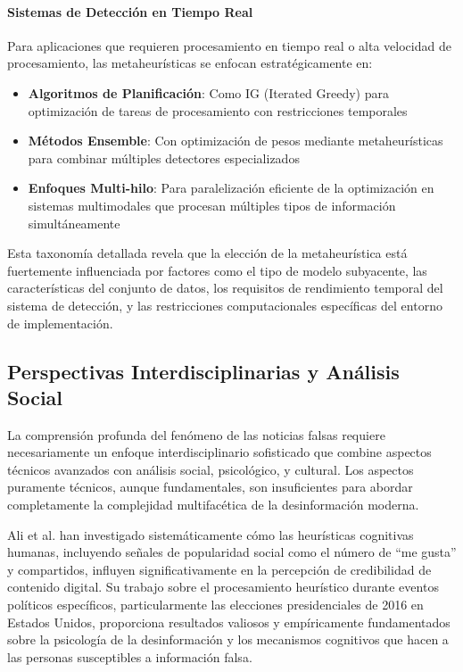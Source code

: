 \paragraph{Sistemas de Detección en Tiempo Real}
Para aplicaciones que requieren procesamiento en tiempo real o alta velocidad de procesamiento, las metaheurísticas se enfocan estratégicamente en:
\begin{itemize}
    \item \textbf{Algoritmos de Planificación}: Como IG (Iterated Greedy) para optimización de tareas de procesamiento con restricciones temporales \cite{aqil2021modeling}
    \item \textbf{Métodos Ensemble}: Con optimización de pesos mediante metaheurísticas para combinar múltiples detectores especializados \cite{das2022heuristic, yasmin2024ensemble}
    \item \textbf{Enfoques Multi-hilo}: Para paralelización eficiente de la optimización en sistemas multimodales que procesan múltiples tipos de información simultáneamente \cite{yildirim2023novel}
\end{itemize}

Esta taxonomía detallada revela que la elección de la metaheurística está fuertemente influenciada por factores como el tipo de modelo subyacente, las características del conjunto de datos, los requisitos de rendimiento temporal del sistema de detección, y las restricciones computacionales específicas del entorno de implementación.

\subsection{Perspectivas Interdisciplinarias y Análisis Social}

La comprensión profunda del fenómeno de las noticias falsas requiere necesariamente un enfoque interdisciplinario sofisticado que combine aspectos técnicos avanzados con análisis social, psicológico, y cultural. Los aspectos puramente técnicos, aunque fundamentales, son insuficientes para abordar completamente la complejidad multifacética de la desinformación moderna.

Ali et al. \cite{ali2021fake, ali2020posttruth} han investigado sistemáticamente cómo las heurísticas cognitivas humanas, incluyendo señales de popularidad social como el número de ``me gusta'' y compartidos, influyen significativamente en la percepción de credibilidad de contenido digital. Su trabajo sobre el procesamiento heurístico durante eventos políticos específicos, particularmente las elecciones presidenciales de 2016 en Estados Unidos, proporciona resultados valiosos y empíricamente fundamentados sobre la psicología de la desinformación y los mecanismos cognitivos que hacen a las personas susceptibles a información falsa.

